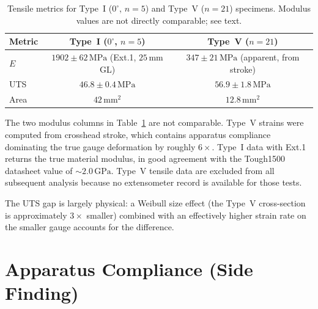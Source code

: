 \begin{table}[!ht]
  \centering
  \caption{Tensile metrics for Type~I ($0^{\circ}$, $n = 5$) and Type~V
           ($n = 21$) specimens. Modulus values are not directly comparable;
           see text.}
  \label{tab:poisson-typeIvsV}
  \begin{tabular}{lcc}
    \toprule
    Metric & Type~I ($0^{\circ}$, $n=5$) & Type~V ($n=21$) \\
    \midrule
    $E$    & $1902 \pm 62\,\mathrm{MPa}$ (Ext.1, $25\,\mathrm{mm}$ GL)
           & $347 \pm 21\,\mathrm{MPa}$ (apparent, from stroke) \\
    UTS    & $46.8 \pm 0.4\,\mathrm{MPa}$ & $56.9 \pm 1.8\,\mathrm{MPa}$ \\
    Area   & $42\,\mathrm{mm}^{2}$ & $12.8\,\mathrm{mm}^{2}$ \\
    \bottomrule
  \end{tabular}
\end{table}

The two modulus columns in Table~\ref{tab:poisson-typeIvsV} are not
comparable. Type~V strains were computed from crosshead stroke, which contains
apparatus compliance dominating the true gauge deformation by roughly
$6\times$. Type~I data with Ext.1 returns the true material modulus, in good
agreement with the Tough1500 datasheet value of $\sim 2.0\,\mathrm{GPa}$.
Type~V tensile data are excluded from all subsequent analysis because no
extensometer record is available for those tests.

The UTS gap is largely physical: a Weibull size effect (the Type~V
cross-section is approximately $3\times$ smaller) combined with an
effectively higher strain rate on the smaller gauge accounts for the
difference.

\section{Apparatus Compliance (Side Finding)}
\label{sec:poisson-apparatus}


